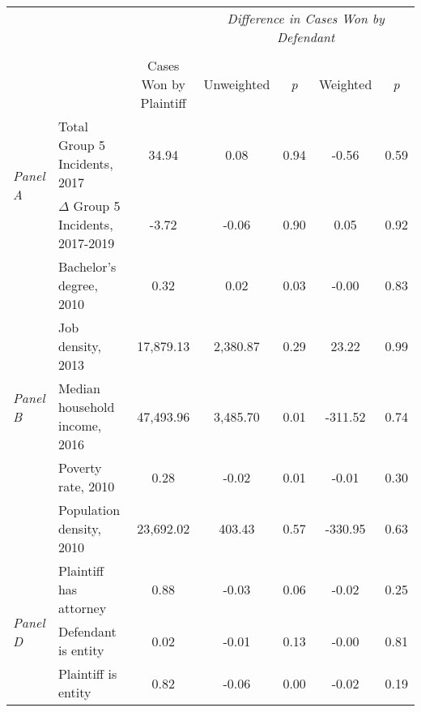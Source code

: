 \begin{tabular}{llccccc}
\toprule
 &  & \textit{} & \multicolumn{4}{c}{\textit{Difference in Cases Won by Defendant}} \\
\cline{4-7}
\\
 &  & Cases Won by Plaintiff & Unweighted & \emph{p} & Weighted & \emph{p} \\
\midrule
\multirow[c]{2}{.75cm}{\textit{Panel A}} & Total Group 5 Incidents, 2017 & 34.94 & 0.08 & 0.94 & -0.56 & 0.59 \\
 & $\Delta$ Group 5 Incidents, 2017-2019 & -3.72 & -0.06 & 0.90 & 0.05 & 0.92 \\
\cline{1-7}
\multirow[c]{5}{.75cm}{\textit{Panel B}} & Bachelor's degree, 2010 & 0.32 & 0.02 & 0.03 & -0.00 & 0.83 \\
 & Job density, 2013 & 17,879.13 & 2,380.87 & 0.29 & 23.22 & 0.99 \\
 & Median household income, 2016 & 47,493.96 & 3,485.70 & 0.01 & -311.52 & 0.74 \\
 & Poverty rate, 2010 & 0.28 & -0.02 & 0.01 & -0.01 & 0.30 \\
 & Population density, 2010 & 23,692.02 & 403.43 & 0.57 & -330.95 & 0.63 \\
\cline{1-7}
\multirow[c]{3}{.75cm}{\textit{Panel D}} & Plaintiff has attorney & 0.88 & -0.03 & 0.06 & -0.02 & 0.25 \\
 & Defendant is entity & 0.02 & -0.01 & 0.13 & -0.00 & 0.81 \\
 & Plaintiff is entity & 0.82 & -0.06 & 0.00 & -0.02 & 0.19 \\
\cline{1-7}
\bottomrule
\end{tabular}
